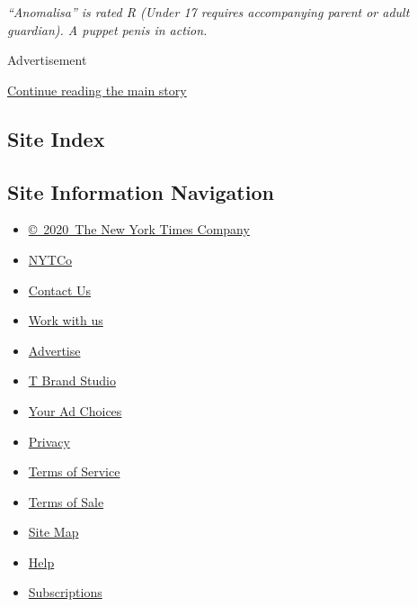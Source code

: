 \emph{``Anomalisa'' is rated R (Under 17 requires accompanying parent or
adult guardian). A puppet penis in action.}

Advertisement

\protect\hyperlink{after-bottom}{Continue reading the main story}

\hypertarget{site-index}{%
\subsection{Site Index}\label{site-index}}

\hypertarget{site-information-navigation}{%
\subsection{Site Information
Navigation}\label{site-information-navigation}}

\begin{itemize}
\tightlist
\item
  \href{https://help.nytimes3xbfgragh.onion/hc/en-us/articles/115014792127-Copyright-notice}{©~2020~The
  New York Times Company}
\end{itemize}

\begin{itemize}
\tightlist
\item
  \href{https://www.nytco.com/}{NYTCo}
\item
  \href{https://help.nytimes3xbfgragh.onion/hc/en-us/articles/115015385887-Contact-Us}{Contact
  Us}
\item
  \href{https://www.nytco.com/careers/}{Work with us}
\item
  \href{https://nytmediakit.com/}{Advertise}
\item
  \href{http://www.tbrandstudio.com/}{T Brand Studio}
\item
  \href{https://www.nytimes3xbfgragh.onion/privacy/cookie-policy\#how-do-i-manage-trackers}{Your
  Ad Choices}
\item
  \href{https://www.nytimes3xbfgragh.onion/privacy}{Privacy}
\item
  \href{https://help.nytimes3xbfgragh.onion/hc/en-us/articles/115014893428-Terms-of-service}{Terms
  of Service}
\item
  \href{https://help.nytimes3xbfgragh.onion/hc/en-us/articles/115014893968-Terms-of-sale}{Terms
  of Sale}
\item
  \href{https://spiderbites.nytimes3xbfgragh.onion}{Site Map}
\item
  \href{https://help.nytimes3xbfgragh.onion/hc/en-us}{Help}
\item
  \href{https://www.nytimes3xbfgragh.onion/subscription?campaignId=37WXW}{Subscriptions}
\end{itemize}
